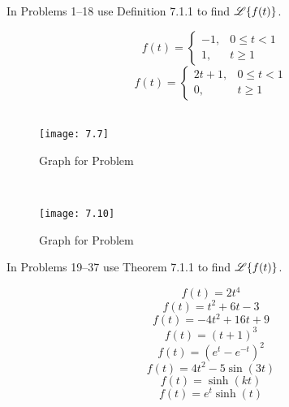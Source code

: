 \documentclass[chapter=7,section=1]{math252homework}
\begin{document}
In Problems 1--18 use Definition 7.1.1 to find $\mathscr{L} \{ f(t) \}$.
\begin{problems}
	\problem \[ f(t) = \left\{ \begin{array}{rr}
		-1, & 0 \leq t < 1\\
		1,	& t \geq 1
	\end{array} \right. \] %
	\setcounter{problemsi}{3}
	\problem \[ f(t) = \left\{ \begin{array}{rr}
		2t+1, & 0 \leq t < 1\\
		0, & t \geq 1
	\end{array} \right. \] %
	\setcounter{problemsi}{6}
	\problem~\begin{figure}[H]
				 \centering
				 \texttt{[image: 7.7]}
				 \caption{Graph for Problem \hyperref[prb:7]{}}
				 \label{fig:7}
	\end{figure} %
	\setcounter{problemsi}{9}
	\problem~\begin{figure}[H]
				 \centering
				 \texttt{[image: 7.10]}
				 \caption{Graph for Problem \hyperref[prb:10]{}}
				 \label{fig:10}
	\end{figure} %
\end{problems}

In Problems 19--37 use Theorem 7.1.1 to find $\mathscr{L} \{ f(t) \}$.
\begin{problems}[start=19]
	\problem \[ f(t) = 2t^{4} \] %
	\setcounter{problemsi}{22}
	\problem \[ f(t) = t^{2} + 6t - 3 \] %
	\problem \[ f(t) = -4t^{2} + 16t + 9 \] %
	\problem \[ f(t) = (t+1)^{3} \] %
	\setcounter{problemsi}{29}
	\problem \[ f(t) = (e^{t}-e^{-t})^{2} \] %
	\problem \[ f(t) = 4t^{2} - 5\sin(3t) \] %
	\setcounter{problemsi}{32}
	\problem \[ f(t) = \sinh(kt) \] %
	\setcounter{problemsi}{34}
	\problem \[ f(t) = e^{t}\sinh(t) \] %
\end{problems}
\end{document}
